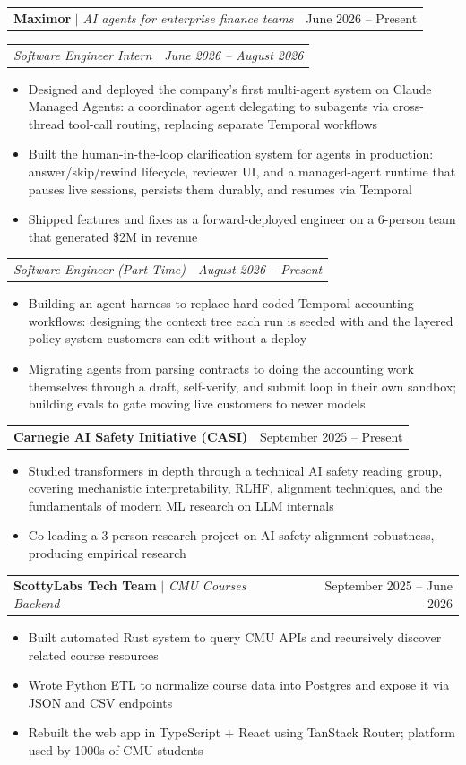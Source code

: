 \documentclass[letterpaper,11pt]{article}
\makeatletter
\newcommand{\resumeItem}[1]{
  \item\small{
    {#1 \vspace{-2pt}}
  }
}
\newcommand{\resumeSubSubheading}[2]{
    \item
    \begin{tabular*}{0.97\textwidth}{l@{\extracolsep{\fill}}r}
      \textit{\small#1} & \textit{\small #2} \\
    \end{tabular*}\vspace{-7pt}
}
\newcommand{\resumeProjectHeading}[2]{
    \item
    \begin{tabular*}{0.97\textwidth}{l@{\extracolsep{\fill}}r}
      \small#1 & #2 \\
    \end{tabular*}\vspace{-7pt}
}
\newcommand{\resumeItemListStart}{\begin{itemize}[itemsep=0pt]}
\newcommand{\resumeItemListEnd}{\end{itemize}\vspace{-5pt}}
\makeatother
\begin{document}
      \resumeProjectHeading
          {\textbf{Maximor} $|$ \emph{AI agents for enterprise finance teams}}{June 2026 -- Present}
      \resumeSubSubheading
          {Software Engineer Intern}{June 2026 -- August 2026}
          \resumeItemListStart
            \resumeItem{Designed and deployed the company's first multi-agent system on Claude Managed Agents: a coordinator agent delegating to subagents via cross-thread tool-call routing, replacing separate Temporal workflows}
            \resumeItem{Built the human-in-the-loop clarification system for agents in production: answer/skip/rewind lifecycle, reviewer UI, and a managed-agent runtime that pauses live sessions, persists them durably, and resumes via Temporal}
            \resumeItem{Shipped features and fixes as a forward-deployed engineer on a 6-person team that generated \$2M in revenue}
          \resumeItemListEnd
      \resumeSubSubheading
          {Software Engineer (Part-Time)}{August 2026 -- Present}
          \resumeItemListStart
            \resumeItem{Building an agent harness to replace hard-coded Temporal accounting workflows: designing the context tree each run is seeded with and the layered policy system customers can edit without a deploy}
            \resumeItem{Migrating agents from parsing contracts to doing the accounting work themselves through a draft, self-verify, and submit loop in their own sandbox; building evals to gate moving live customers to newer models}
          \resumeItemListEnd

      \resumeProjectHeading
          {\textbf{Carnegie AI Safety Initiative (CASI)}}{September 2025 -- Present}
          \resumeItemListStart
            \resumeItem{Studied transformers in depth through a technical AI safety reading group, covering mechanistic interpretability, RLHF, alignment techniques, and the fundamentals of modern ML research on LLM internals}
            \resumeItem{Co-leading a 3-person research project on AI safety alignment robustness, producing empirical research}
          \resumeItemListEnd

      \resumeProjectHeading
          {\textbf{ScottyLabs Tech Team} $|$ \emph{CMU Courses Backend}}{September 2025 -- June 2026}
          \resumeItemListStart
            \resumeItem{Built automated Rust system to query CMU APIs and recursively discover related course resources}
            \resumeItem{Wrote Python ETL to normalize course data into Postgres and expose it via JSON and CSV endpoints}
            \resumeItem{Rebuilt the web app in TypeScript + React using TanStack Router; platform used by 1000s of CMU students}
          \resumeItemListEnd
\end{document}
